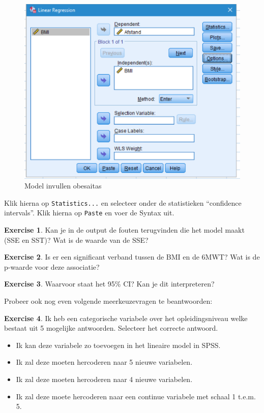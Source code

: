\documentclass[
]{book}
\providecommand{\tightlist}{%
  \setlength{\itemsep}{0pt}\setlength{\parskip}{0pt}}
\theoremstyle{definition}
\theoremstyle{definition}
\theoremstyle{definition}
\newtheorem{exercise}{Exercise}[chapter]
\theoremstyle{definition}
\theoremstyle{remark}
\begin{document}
\begin{figure}
\includegraphics[width=1\linewidth]{img/ex_spss_lm_4} \caption{Model invullen obesaitas}\label{fig:exspsslm4}
\end{figure}

Klik hierna op \texttt{Statistics...} en selecteer onder de statistieken ``confidence intervals''. Klik hierna op \texttt{Paste} en voer de Syntax uit.

\begin{exercise}
Kan je in de output de fouten terugvinden die het model maakt (SSE en SST)? Wat is de waarde van de SSE?
\end{exercise}

\begin{exercise}
Is er een significant verband tussen de BMI en de 6MWT? Wat is de p-waarde voor deze associatie?
\end{exercise}

\begin{exercise}
Waarvoor staat het 95\% CI? Kan je dit interpreteren?
\end{exercise}

Probeer ook nog even volgende meerkeuzevragen te beantwoorden:

\begin{exercise}

Ik heb een categorische variabele over het opleidingsniveau welke bestaat uit 5 mogelijke antwoorden. Selecteer het correcte antwoord.

\begin{itemize}
\tightlist
\item
  Ik kan deze variabele zo toevoegen in het lineaire model in SPSS.
\item
  Ik zal deze moeten hercoderen naar 5 nieuwe variabelen.
\item
  Ik zal deze moeten hercoderen naar 4 nieuwe variabelen.
\item
  Ik zal deze moete hercoderen naar een continue variabele met schaal 1 t.e.m. 5.
\end{itemize}

\end{exercise}
\end{document}
